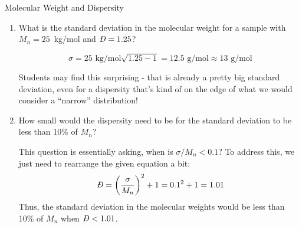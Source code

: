 \begin{activity}{Molecular Weight and Dispersity}
\begin{exercises}
			\begin{enumerate}
				\item What is the standard deviation in the molecular weight for a sample with $M_n=25$~kg/mol and $\PDImath=1.25$?
					
					\begin{solution}{}
						\begin{equation*}
							\sigma = 25\text{ kg/mol}\sqrt{1.25-1} = 12.5\text{ g/mol} \approx 13\text{ g/mol}
						\end{equation*}
						
						Students may find this surprising - that is already a pretty big standard deviation, even for a dispersity that's kind of on the edge of what we would consider a ``narrow'' distribution!
					\end{solution}
				
				\item How small would the dispersity need to be for the standard deviation to be less than 10\% of $M_n$?
					
					\begin{solution}
					This question is essentially asking, when is $\sigma/M_n < 0.1$?  To address this, we just need to rearrange the given equation a bit:
					\begin{equation*}
						\PDImath = \left(\frac{\sigma}{M_n}\right)^2 + 1 = 0.1^2 + 1 = 1.01
					\end{equation*}
					Thus, the standard deviation in the molecular weights would be less than 10\% of $M_n$ when $\PDImath<1.01$.
					\end{solution}
					
			\end{enumerate}
			
\end{exercises}
	
\end{activity}